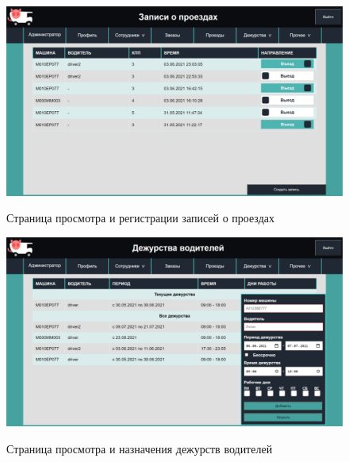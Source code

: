 \begin{figure}[h!] 
	\begin{center}
		{\includegraphics[scale=0.43, angle=0]{sc/all_pass}}
		\caption{Страница просмотра и регистрации записей о проездах}
		\label{all_pass_sc}
	\end{center}
\end{figure}

\begin{figure}[h!] 
	\begin{center}
		{\includegraphics[scale=0.43, angle=0]{sc/driver_duty}}
		\caption{Страница просмотра и назначения дежурств водителей}
		\label{driver_duty_sc}
	\end{center}
\end{figure}

